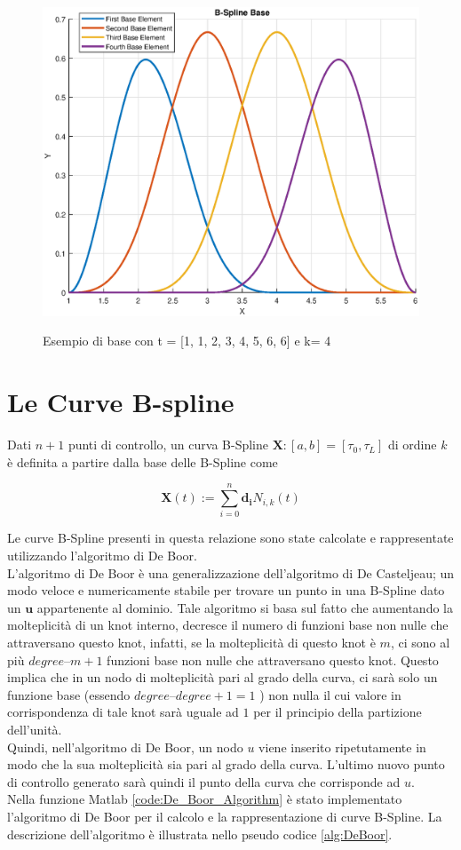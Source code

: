 \documentclass[a4paper, 12pt]{article}
\begin{document}
\begin{figure}[!]
	\centering
	\caption{Esempio di base con t = [1, 1, 2, 3, 4, 5, 6, 6] e k= 4}
	\includegraphics[scale=0.7]{b-spline_base_plot.eps}
	\label{fig:BSplineinBaseExample}
\end{figure}

\section{Le Curve B-spline}
Dati $n+1$ punti di controllo, un curva B-Spline $\mathbf{X} : [a,b] = [\tau_0, \tau_L]$ di ordine $k$ è definita a partire dalla base delle B-Spline come

$$\mathbf{X}(t) := \sum_{i=0}^{n} \mathbf{d_i} N_{i, k}(t)$$

Le curve B-Spline presenti in questa relazione sono state calcolate e rappresentate  utilizzando l'algoritmo di De Boor.\\ 
L'algoritmo di De Boor è una generalizzazione dell'algoritmo di De Casteljeau; un modo veloce e numericamente stabile per trovare un punto in una B-Spline dato un $\mathbf{u}$ appartenente al dominio. Tale algoritmo si basa sul fatto che aumentando la molteplicità di un knot interno, decresce il numero di funzioni base non nulle che attraversano questo knot, infatti, se la molteplicità di questo knot è $m$, ci sono al più $degree – m +1$ funzioni base non nulle che attraversano questo knot. Questo implica che in un nodo di molteplicità pari al grado della curva, ci sarà solo un funzione base (essendo $degree – degree + 1 = 1$ ) non nulla il cui valore in corrispondenza di tale knot sarà uguale ad $1$ per il principio della partizione dell'unità.\\
Quindi, nell'algoritmo di De Boor, un nodo $u$ viene inserito ripetutamente in modo che la sua molteplicità sia pari al grado della curva. L'ultimo nuovo punto di controllo generato sarà quindi il punto della curva che corrisponde ad $u$.\\
Nella funzione Matlab  \ref{code:De_Boor_Algorithm} è stato implementato l'algoritmo di De Boor per il calcolo e la rappresentazione di curve B-Spline. La descrizione dell'algoritmo è illustrata nello pseudo codice \ref{alg:DeBoor}.
\end{document}
